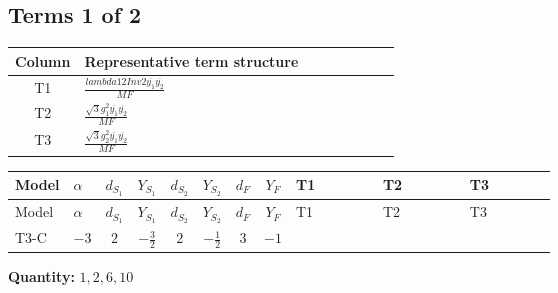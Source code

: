 \documentclass[8pt]{article}
\begin{document}
\begin{landscape}
\subsection*{Terms 1 of 2}
\begin{center}
\begin{tabular}{@{}c >{\raggedright\arraybackslash}p{0.82\linewidth}@{}}
\toprule
Column & Representative term structure \\
\midrule
T1 & \(\displaystyle \frac{lambda12Inv2 \overline{y_{1}} \overline{y_{2}}}{MF}\) \\
\midrule
T2 & \(\displaystyle \frac{\sqrt{3} g_{1}^{2} \overline{y_{1}} \overline{y_{2}}}{MF}\) \\
\midrule
T3 & \(\displaystyle \frac{\sqrt{3} g_{2}^{2} \overline{y_{1}} \overline{y_{2}}}{MF}\) \\
\midrule
\bottomrule
\end{tabular}
\end{center}
\smallskip
\tiny
\begin{longtable}{@{}llcccccc >{\raggedright\arraybackslash}p{0.21\linewidth} >{\raggedright\arraybackslash}p{0.21\linewidth} >{\raggedright\arraybackslash}p{0.21\linewidth}@{}}
\toprule
Model & $\alpha$ & $d_{S_1}$ & $Y_{S_1}$ & $d_{S_2}$ & $Y_{S_2}$ & $d_F$ & $Y_F$ & T1 & T2 & T3 \\
\midrule
\endfirsthead
\toprule
Model & $\alpha$ & $d_{S_1}$ & $Y_{S_1}$ & $d_{S_2}$ & $Y_{S_2}$ & $d_F$ & $Y_F$ & T1 & T2 & T3 \\
\midrule
\endhead
T3-C & $-3$ & $2$ & $-\frac{3}{2}$ & $2$ & $-\frac{1}{2}$ & $3$ & $-1$ & \scriptsize\adjustbox{max width=\linewidth}{$\begin{gathered} - \frac{lambda12Inv2 \overline{y_{1}} \overline{y_{2}}}{6 MF}\end{gathered}$} & \scriptsize\adjustbox{max width=\linewidth}{$\begin{gathered} - \frac{\sqrt{3} g_{1}^{2} \overline{y_{1}} \overline{y_{2}}}{4 MF}\end{gathered}$} & \scriptsize\adjustbox{max width=\linewidth}{$\begin{gathered} - \frac{\sqrt{3} g_{2}^{2} \overline{y_{1}} \overline{y_{2}}}{8 MF}\end{gathered}$} \\
\midrule
\bottomrule
\end{longtable}
\clearpage
\noindent\textbf{Quantity: }$\mathrm{1,2,6,10}$\par\smallskip

\end{landscape}
\end{document}
